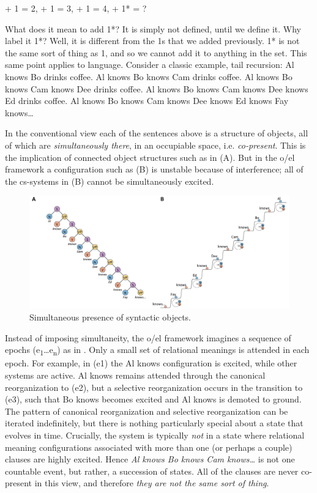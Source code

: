    + 1 = 2,  + 1 = 3,  + 1 = 4,  + 1* = ?
\z

  What does it mean to add 1*? It is simply not defined, until we define it. Why label it 1*? Well, it is different from the 1s that we added previously. 1* is not the same sort of thing as 1, and so we cannot add it to anything in the set. This same point applies to language. Consider a classic example, tail recursion:
\ea
\ea
{Al knows Bo drinks coffee.}
\ex
{Al knows Bo knows Cam drinks coffee.}
\ex
{Al knows Bo knows Cam knows Dee drinks coffee.}
\ex
{Al knows Bo knows Cam knows Dee knows Ed drinks coffee.}
\ex
{Al knows Bo knows Cam knows Dee knows Ed knows Fay knows…}
\z
\z

In the conventional view each of the sentences above is a structure of objects, all of which are \textit{simultaneously there}, in an occupiable space, i.e. \textit{co-present}. This is the implication of connected object structures such as in {}(A). But in the o/el framework a configuration such as {}(B) is unstable because of interference; all of the cs-systems in (B) cannot be simultaneously excited. 

  
\begin{figure}
\includegraphics[width=\textwidth]{figures/Tilsen-img105.png}
\caption{Simultaneous presence of syntactic objects.}
\label{fig:5:1}
\end{figure}
 

  Instead of imposing simultaneity, the o/el framework imagines a sequence of epochs (e\textsubscript{1}…e\textsubscript{n}) as in {}. Only a small set of relational meanings is attended in each epoch. For example, in (e1) the {\textbar}Al knows{\textbar} configuration is excited, while other systems are active. {\textbar}Al knows{\textbar} remains attended through the canonical reorganization to (e2),  but a selective reorganization occurs in the transition to (e3), such that {\textbar}Bo knows{\textbar} becomes excited and {\textbar}Al knows{\textbar} is demoted to ground. The pattern of canonical reorganization and selective reorganization can be iterated indefinitely, but there is nothing particularly special about a state that evolves in time. Crucially, the system is typically \textit{not} in a state where relational meaning configurations associated with more than one (or perhaps a couple) clauses are highly excited. Hence \textit{Al knows Bo knows Cam knows…} is not one countable event, but rather, a succession of states. All of the clauses are never co-present in this view, and therefore \textit{they are not the same sort of thing}.

